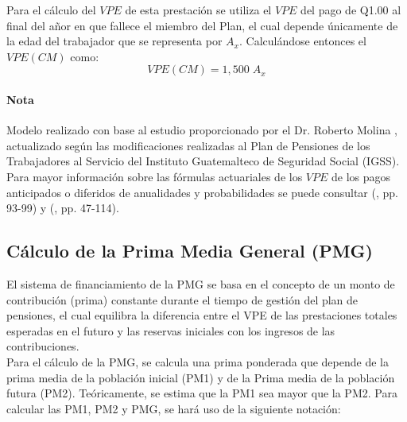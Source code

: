 \documentclass[12pt,letterpaper,titlepage]{article}
\begin{document}
{Para el cálculo del $V\!PE$ de esta prestación se utiliza el $V\!PE$ del pago de Q1.00 al final del añor en que fallece el miembro del Plan, el cual depende únicamente de la edad del trabajador que se representa por $A_{x}$. Calculándose entonces el $V\!PE(CM)$ como:
\[ V\!PE(CM)=1,500\;A_{x} \]

\paragraph{Nota} Modelo realizado con base al estudio proporcionado por el Dr. Roberto Molina \cite{pla0105}, actualizado según las modificaciones realizadas al Plan de Pensiones de los Trabajadores al Servicio del Instituto Guatemalteco de Seguridad Social (IGSS). Para mayor información sobre las fórmulas actuariales de los $V\!PE$ de los pagos anticipados o diferidos de anualidades y probabilidades se puede consultar (\cite{amssp}, pp. 93-99) y (\cite{tass}, pp. 47-114).

\subsection{Cálculo de la Prima Media General (PMG)}

El sistema de financiamiento de la PMG se basa en el concepto de un monto de contribución (prima) constante durante el tiempo de gestión del plan de pensiones, el cual equilibra la diferencia entre el VPE de las prestaciones totales esperadas en el futuro y las reservas iniciales con los ingresos de las contribuciones. \\


Para el cálculo de la PMG, se calcula una prima ponderada que depende de la prima media de la población inicial (PM1) y de la Prima media de la población futura (PM2). Teóricamente, se estima que la PM1 sea mayor que la PM2. Para calcular las PM1, PM2 y PMG, se hará uso de la siguiente notación:

}
\end{document}
